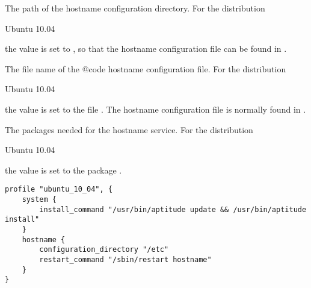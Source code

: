The path of the hostname configuration directory.
For the distribution
\begin{inparaitem}
\item[\TheDistribution{ubuntu}] Ubuntu 10.04
\end{inparaitem}
the value is set to , so that the hostname configuration
file can be found in .


The file name of the {@code hostname} configuration file.
For the distribution
\begin{inparaitem}
\item[\TheDistribution{ubuntu}] Ubuntu 10.04
\end{inparaitem}
the value is set to the file . The hostname configuration
file is normally found in .


The packages needed for the hostname service.
For the distribution
\begin{inparaitem}
\item[\TheDistribution{ubuntu}] Ubuntu 10.04
\end{inparaitem}
the value is set to the package .

\begin{lstlisting}[style=Sscontrol,
label={lst:hostname_ubuntu_profile},
title={Ubuntu hostname profile.}]
profile "ubuntu_10_04", {
    system {
        install_command "/usr/bin/aptitude update && /usr/bin/aptitude install"
    }
    hostname {
        configuration_directory "/etc"
        restart_command "/sbin/restart hostname"
    }
}
\end{lstlisting}
